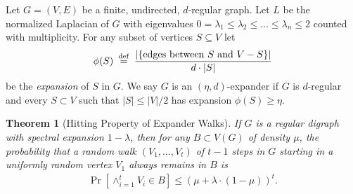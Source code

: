 \documentclass{article}
\newtheorem{theorem}{Theorem}
\newcommand{\eqdef}{\mathbin{\stackrel{\rm def}{=}}}
\begin{document}
Let $G = (V, E)$ be a finite, undirected, $d$-regular graph.
Let $L$ be the normalized Laplacian of $G$ with eigenvalues
$0 = \lambda_1 \le \lambda_2 \le \dots \le \lambda_n \le 2$
counted with multiplicity.
For any subset of vertices $S \subseteq V$ let
\begin{align*}
\phi(S) \;\eqdef\; \frac{|\{\text{edges between } S \text{ and } V - S\}|}{d\cdot |S|}
\end{align*}
be the \emph{expansion} of $S$ in $G$.
We say $G$ is an $(\eta, d)$-expander if $G$ is $d$-regular and
every $S \subset V$ such that $|S| \le |V|/2$ has expansion $\phi(S) \ge \eta$.

\begin{theorem}[Hitting Property of Expander Walks]
If $G$ is a regular digraph with spectral expansion $1 - \lambda$, then for any $B \subset V(G)$
of density $\mu$, the probability that a random walk $(V_1, \dots, V_t)$ of $t - 1$
steps in $G$ starting in a uniformly random vertex $V_1$ always remains in $B$ is
\begin{align*}
\Pr\left[\wedge_{i=1}^t V_i \in B\right] \le (\mu + \lambda \cdot (1 - \mu))^t.\\
\end{align*}
\end{theorem}



\end{document}

